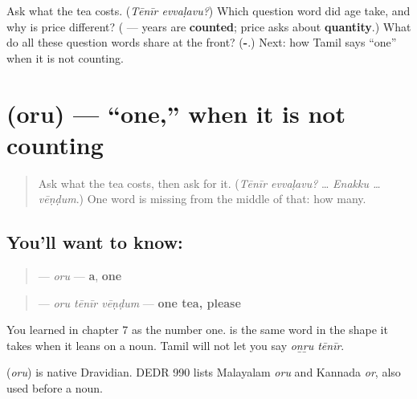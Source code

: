 \begin{tcolorbox}[breakable,colback=teal!4,colframe=teal!35!black,title={Before you move on}]
Ask what the tea costs. (\emph{Tēnīr evvaḷavu?}) Which question word did age take, and why is price different? (\textbf{} — years are \textbf{counted}; price asks about \textbf{quantity}.) What do all these question words share at the front? (\textbf{-}.) Next: how Tamil says \textquotedblleft{}one\textquotedblright{} when it is not counting.
\end{tcolorbox}
\section[\texorpdfstring{\ta{ஒரு} (oru)}{ஒரு (oru)}]{ (oru) — \textquotedblleft{}one,\textquotedblright{} when it is not counting}

\label{lesson:TA-C39-oru}



\begin{quote}
Ask what the tea costs, then ask for it. (\emph{Tēnīr evvaḷavu?} … \emph{Enakku … vēṇḍum}.) One word is missing from the middle of that: how many.
\end{quote}

\subsection*{You'll want to know: }
\begin{quote}
\textbf{} — \emph{oru} — \textbf{a}, \textbf{one}
\end{quote}

\begin{quote}
\textbf{  } — \emph{oru tēnīr vēṇḍum} — \textbf{one tea, please}
\end{quote}

You learned \textbf{} in chapter 7 as the number one. \textbf{} is the same word in the shape it takes when it leans on a noun. Tamil will not let you say \emph{oṉṟu tēnīr}.

\begin{cousinweb}
\textbf{} (\emph{oru}) is native Dravidian. DEDR 990 lists Malayalam \emph{oru} and Kannada \emph{or}, also used before a noun.
\end{cousinweb}

